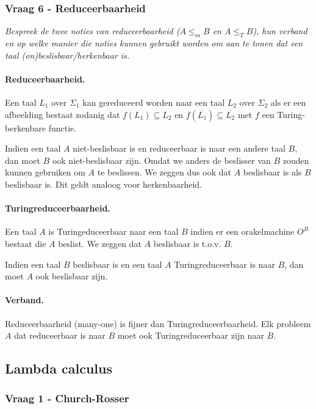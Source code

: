 \subsubsection{Vraag 6 - Reduceerbaarheid}

\textit{Bespreek de twee noties van reduceerbaarheid ($A \leq_m B$ en $A \leq_T B$), hun verband en op welke manier die noties kunnen gebruikt worden om aan te tonen dat een taal (on)beslisbaar/herkenbaar is.}

\paragraph{Reduceerbaarheid.} Een taal $L_1$ over $\Sigma_1$ kan gereduceerd worden naar een taal $L_2$ over $\Sigma_2$ als er een afbeelding  bestaat zodanig dat $f(L_1) \subseteq L_2$ en $f(\overline{L_1}) \subseteq \overline{L_2}$ met $f$ een Turing-berkenbare functie.

Indien een taal $A$ niet-beslisbaar is en reduceerbaar is naar een andere taal $B$, dan moet $B$ ook niet-beslisbaar zijn. Omdat we anders de beslisser van $B$ zouden kunnen gebruiken om $A$ te beslissen. We zeggen dus ook dat $A$ beslisbaar is als $B$ beslisbaar is. Dit geldt analoog voor herkenbaarheid.

\paragraph{Turingreduceerbaarheid.} Een taal $A$ is Turingeduceerbaar naar een taal $B$ indien er een orakelmachine $O^B$ bestaat die $A$ beslist. We zeggen dat $A$ beslisbaar is t.o.v. $B$.

Indien een taal $B$ beslisbaar is en een taal $A$ Turingreduceerbaar is naar $B$, dan moet $A$ ook beslisbaar zijn.

\paragraph{Verband.} Reduceerbaarheid (many-one) is fijner dan Turingreduceerbaarheid. Elk probleem $A$ dat reduceerbaar is naar $B$ moet ook Turingreduceerbaar zijn naar $B$.

\subsection{Lambda calculus}

\subsubsection{Vraag 1 - Church-Rosser}

